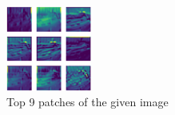 \documentclass[11pt]{article}
\begin{document}
\begin{enumerate}
\begin{figure}[h!]
     \includegraphics[width=0.25\textwidth]{images/2_top_layers}
        \caption{Top 9 patches of the given image}
\end{figure}

\end{enumerate}
\end{document}
